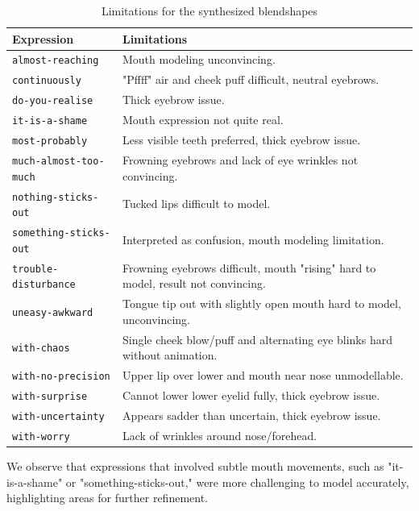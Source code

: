 \documentclass[../../main]{subfiles}
\begin{document}
\begin{table}
    \centering
    \begin{tabular}{|l|p{8cm}|}
    \hline
    \textbf{Expression} & \textbf{Limitations} \\
    \hline
    \texttt{almost-reaching} & Mouth modeling unconvincing. \\
    \hline
    \texttt{continuously} & "Pffff" air and cheek puff difficult, neutral eyebrows. \\
    \hline
    \texttt{do-you-realise} & Thick eyebrow issue. \\
    \hline
    \texttt{it-is-a-shame} & Mouth expression not quite real. \\
    \hline
    \texttt{most-probably} & Less visible teeth preferred, thick eyebrow issue. \\
    \hline
    \texttt{much-almost-too-much} & Frowning eyebrows and lack of eye wrinkles not convincing. \\
    \hline
    \texttt{nothing-sticks-out} & Tucked lips difficult to model. \\
    \hline
   \texttt{something-sticks-out} & Interpreted as confusion, mouth modeling limitation. \\
    \hline
    \texttt{trouble-disturbance} & Frowning eyebrows difficult, mouth "rising" hard to model, result not convincing. \\
    \hline
    \texttt{uneasy-awkward} & Tongue tip out with slightly open mouth hard to model, unconvincing. \\
    \hline
    \texttt{with-chaos} & Single cheek blow/puff and alternating eye blinks hard without animation. \\
    \hline
    \texttt{with-no-precision} & Upper lip over lower and mouth near nose unmodellable. \\
    \hline
    \texttt{with-surprise} & Cannot lower lower eyelid fully, thick eyebrow issue. \\
    \hline
    \texttt{with-uncertainty} & Appears sadder than uncertain, thick eyebrow issue. \\
    \hline
    \texttt{with-worry} & Lack of wrinkles around nose/forehead. \\
    \hline
    \end{tabular}
    \caption{Limitations for the synthesized blendshapes}
    \label{tab:facial_expressions_evaluation}
\end{table}

We observe that expressions that involved subtle mouth movements, such as "it-is-a-shame" or "something-sticks-out," were more challenging to model accurately, highlighting areas for further refinement.
\end{document}
